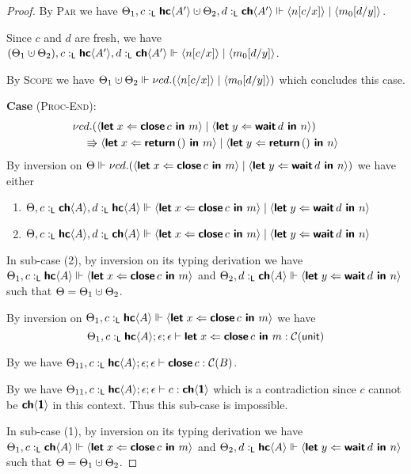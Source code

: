 \begin{proof}
  \noindent
  By \textsc{Par} we have
  ${\Theta_1, c \tL \HC{A'} \dotcup \Theta_2, d \tL \CH{A'} \Vdash \proc{n[c/x]} \mid \proc{m_0[d/y]}}$.

  \noindent
  Since $c$ and $d$ are fresh, we have
  ${(\Theta_1 \dotcup \Theta_2), c \tL \HC{A'}, d \tL \CH{A'} \Vdash \proc{n[c/x]} \mid \proc{m_0[d/y]}}$.

  \noindent
  By \textsc{Scope} we have
  ${\Theta_1 \dotcup \Theta_2 \Vdash \scope{cd}{(\proc{n[c/x]} \mid \proc{m_0[d/y]})}}$
  which concludes this case.

\noindent
\textbf{Case} (\textsc{Proc-End}):
  \begin{align*}
    &\scope{cd}{(\proc{\letin{x}{\close{c}}{m}} \mid \proc{\letin{y}{\wait{d}}{n}})} \\
    &\quad\Rrightarrow 
     \proc{\letin{x}{\return{\ii}}{m}} \mid \proc{\letin{y}{\return{\ii}}{n}} 
  \end{align*}
  By inversion on $\Theta \Vdash \scope{cd}{(\proc{\letin{x}{\close{c}}{m}} \mid \proc{\letin{y}{\wait{d}}{n}})}$ we have either
  \begin{enumerate}
    \item $\Theta, c \tL \CH{A}, d \tL \HC{A} \Vdash \proc{\letin{x}{\close{c}}{m}} \mid \proc{\letin{y}{\wait{d}}{n}}$
    \item $\Theta, c \tL \HC{A}, d \tL \CH{A} \Vdash \proc{\letin{x}{\close{c}}{m}} \mid \proc{\letin{y}{\wait{d}}{n}}$
  \end{enumerate}

  In sub-case (2), by inversion on its typing derivation we have
  ${\Theta_1, c \tL \HC{A} \Vdash \proc{\letin{x}{\close{c}}{m}}}$ and
  ${\Theta_2, d \tL \CH{A} \Vdash \proc{\letin{y}{\wait{d}}{n}}}$ such that ${\Theta = \Theta_1 \dotcup \Theta_2}$.

  \noindent
  By inversion on $\Theta_1, c \tL \HC{A} \Vdash \proc{\letin{x}{\close{c}}{m}}$ we have
  $$\Theta_1, c \tL \HC{A} ; \epsilon ; \epsilon \vdash \letin{x}{\close{c}}{m} : \CM{\unit}$$

  \noindent
  By  we have
  $\Theta_{11}, c \tL \HC{A} ; \epsilon ; \epsilon \vdash \close{c} : \CM{B}$.

  \noindent
  By  we have $\Theta_{11}, c \tL \HC{A} ; \epsilon ; \epsilon \vdash c : \CH{\End}$
  which is a contradiction since $c$ cannot be $\CH{\End}$ in this context. Thus this sub-case is impossible.

  In sub-case (1), by inversion on its typing derivation we have
  ${\Theta_1, c \tL \CH{A} \Vdash \proc{\letin{x}{\close{c}}{m}}}$ and
  ${\Theta_2, d \tL \HC{A} \Vdash \proc{\letin{y}{\wait{d}}{n}}}$ such that ${\Theta = \Theta_1 \dotcup \Theta_2}$.


\end{proof}

